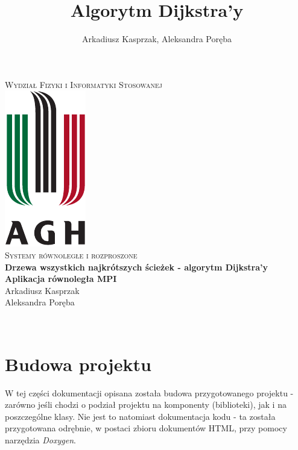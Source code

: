 \documentclass[12pt]{article}
\title{Algorytm Dijkstra'y}
\author{Arkadiusz Kasprzak, Aleksandra Poręba}
\makeatletter
\let\thetitle\@title
\let\theauthor\@author
\makeatother
\begin{document}
\begin{center}
\textsc{\normalsize Wydział Fizyki i Informatyki Stosowanej}\\[2.0cm] 
\includegraphics[scale = 1]{logo.pdf}\\[1cm] 
\textsc{\Large Systemy równoległe i rozproszone}\\[0.4cm] 


{ \huge \bfseries \LARGE{Drzewa wszystkich najkrótszych ścieżek - algorytm Dijkstra'y} }\\[0.2cm] 
{ \huge \bfseries \LARGE{Aplikacja równoległa MPI} }\\[1cm] 

\flushright \Large Arkadiusz Kasprzak \\ Aleksandra Poręba

\vfill 

\center {\today}\\[2cm] 


\pagebreak 

\end{center}

\setcounter{tocdepth}{2}
\tableofcontents
\pagebreak


\pagestyle{fancy}
\fancyhf{}

\rhead{\theauthor}
\lhead{\thetitle}
\cfoot{\thepage}

\section{Budowa projektu}
W tej części dokumentacji opisana została budowa przygotowanego projektu - zarówno jeśli chodzi o podział projektu na komponenty (biblioteki), jak i na poszczególne klasy. Nie jest to natomiast dokumentacja kodu - ta została przygotowana odrębnie, w postaci zbioru dokumentów HTML, przy pomocy narzędzia \textit{Doxygen}.
\end{document}
